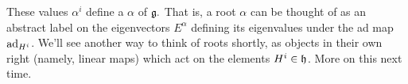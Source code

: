 \begin{defn}
These values $\alpha^i$ define a  $\alpha$ of $\mathfrak{g}.$ That is, a root $\alpha$ can be thought of as an abstract label on the eigenvectors $E^\alpha$ defining its eigenvalues under the ad map $\operatorname{ad}_{H^i}$. We'll see another way to think of roots shortly, as objects in their own right (namely, linear maps) which act on the elements $H^i \in \mathfrak{h}$. More on this next time.
\end{defn}

